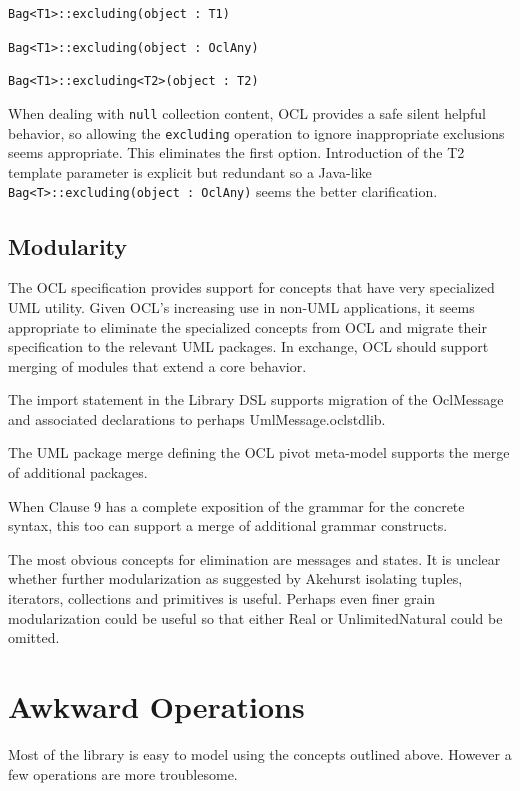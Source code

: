 \documentclass{eceasst}
\begin{document}
\verb|Bag<T1>::excluding(object : T1)|

\verb|Bag<T1>::excluding(object : OclAny)|

\verb|Bag<T1>::excluding<T2>(object : T2)|

When dealing with \verb|null| collection content, OCL provides a safe silent helpful behavior, so allowing the \verb|excluding| operation to ignore inappropriate exclusions seems appropriate. This eliminates the first option. Introduction of the T2 template parameter is explicit but redundant so a Java-like \verb|Bag<T>::excluding(object : OclAny)| seems the better clarification.

\subsection{Modularity}

The OCL specification provides support for concepts that have very specialized UML utility. Given OCL's increasing use in non-UML applications, it seems appropriate to eliminate the specialized concepts from OCL and migrate their specification to the relevant UML packages. In exchange, OCL should support merging of modules that extend a core behavior\cite{Chimiak-Opaka}.

The import statement in the Library DSL supports migration of the OclMessage and associated declarations to perhaps UmlMessage.oclstdlib.

The UML package merge defining the OCL pivot meta-model\cite{OCL-UML} supports the merge of additional packages.

When Clause 9 has a complete exposition of the grammar for the concrete syntax, this too can support a merge of additional grammar constructs. 

The most obvious concepts for elimination are messages and states. It is unclear whether further modularization as suggested by Akehurst\cite{Akehurst} isolating tuples, iterators, collections and primitives is useful. Perhaps even finer grain modularization could be useful so that either Real or UnlimitedNatural could be omitted.

\section{Awkward Operations}\label{AwkwardOperations}

Most of the library is easy to model using the concepts outlined above. However a few operations are more troublesome.
\end{document}
